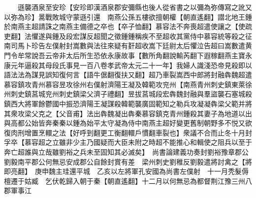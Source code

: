 　　遜襲酒泉至安珍【安珍即漢酒泉郡安彌縣也後人從省書之以彌為弥傳寫之訛又以弥為珍】暠戰敗城守蒙遜引還　南燕公孫五樓欲擅朝權【朝直遙翻】譛北地王鍾於南燕主超請誅之南燕主備德之卒也【卒子恤翻】慕容法不奔喪超遣使讓之【使疏吏翻】法懼遂與鍾及段宏謀反超聞之徵鍾鍾稱疾不至超收其黨侍中慕容統等殺之征南司馬卜珍告左僕射封嵩數與法往來疑有姧超收嵩下廷尉太后懼泣告超曰嵩數遣黄門令牟常說吾云帝非太后所生恐依永康故事【數所角翻說輸芮翻下遐稼翻燕主寶永康元年逼殺其母段氏事見一百八卷孝武帝太元二十一年】我婦人識淺恐帝見殺即以語法法為謀見誤知復何言【語牛倨翻復扶又翻】超乃車裂嵩西中郎將封融犇魏超遣慕容鎮攻青州慕容昱攻徐州右僕射濟陽王凝及韓範攻兖州【南燕青州刺史鎮東萊徐州刺史鎮莒城兖州刺史鎮梁父濟子禮翻】昱拔莒城段宏犇魏封融與羣盜襲石塞城殺鎮西大將軍餘鬱國中振恐濟陽王凝謀殺韓範襲廣固範知之勒兵攻凝凝犇梁父範并將其衆攻梁父克之【父音甫】法出犇魏凝出犇秦慕容鎮克青州鍾殺其妻子為地道以出與高都公始皆奔秦秦以鍾為始平太守凝為侍中南燕主超好變更舊制朝野多不悦又欲復肉刑增置烹轘之法【好呼到翻更工衡翻轘戶慣翻車裂也】衆議不合而止冬十月封孚卒【慕容超之立雖非少主乃國疑而大臣未附之時超不能推心和輯使之阻兵以至于奔亡超誰與立哉雖劉裕之兵未至固知其必滅矣】　尚書論建義功奏封劉裕豫章郡公劉毅南平郡公何無忌安成郡公自餘封賞有差　梁州刺史劉稚反劉毅遣將討禽之【將即亮翻】　庚申魏主珪還平城　乙亥以左將軍孔安國為尚書左僕射　十一月秃髮傉檀遷于姑臧　乞伏乾歸入朝于秦【朝直遙翻】十二月以何無忌為都督荆江豫三州八郡軍事江

